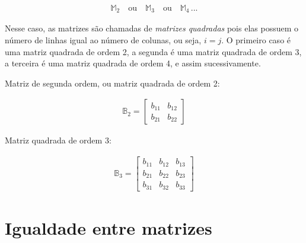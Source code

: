 \begin{ceqn}
	\begin{align*}
	\mathbb{M}_{2}\quad\mathrm{ou}\quad\mathbb{M}_{3}\quad\mathrm{ou\quad\mathbb{M}_{4}\,...}
	\end{align*}
\end{ceqn}

Nesse caso, as matrizes são chamadas de \textit{matrizes quadradas} pois elas possuem o número de linhas igual ao número de colunas, ou
seja, $i=j$. O primeiro caso é uma matriz quadrada de ordem 2, a segunda é uma matriz quadrada de ordem 3, a terceira é uma matriz
quadrada de ordem 4, e assim sucessivamente.
\begin{example}
	Matriz de segunda ordem, ou matriz quadrada de ordem 2:

\begin{ceqn}
	\begin{align*}
		\mathbb{B}_{2}=\begin{bmatrix}b_{11} & b_{12}\\
	b_{21} & b_{22}
	\end{bmatrix}
	\end{align*}
\end{ceqn}

\end{example}
%
\begin{example}
	Matriz quadrada de ordem 3:
	
\begin{ceqn}
	\begin{align*}
		\mathbb{B}_{3}=\begin{bmatrix}b_{11} & b_{12} & b_{13}\\
	b_{21} & b_{22} & b_{23}\\
	b_{31} & b_{32} & b_{33}
	\end{bmatrix}
	\end{align*}
\end{ceqn}

\end{example}


\section{Igualdade entre matrizes}

